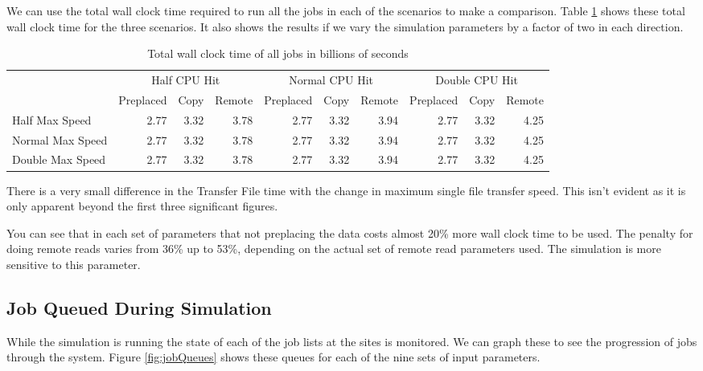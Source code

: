 \documentclass[a4paper]{jpconf}
\begin{document}
We can use the total wall clock time required to run all the jobs in
each of the scenarios to make a comparison. Table \ref{tab:wallClock}
shows these total wall clock time for the three scenarios. It also
shows the results if we vary the simulation parameters by a factor of
two in each direction.


\begin{table}
  \begin{center}
    \begin{scriptsize}
      \begin{tabular}{|l|rrr|rrr|rrr|}
        \hline
        & \multicolumn{3}{|c|}{Half CPU Hit} & \multicolumn{3}{|c|}{Normal CPU
          Hit} & \multicolumn{3}{|c|}{Double CPU Hit} \\
        \cline{2-10}
        & Preplaced & Copy & Remote & Preplaced & Copy & Remote
        & Preplaced & Copy & Remote \\
        \hline
        Half Max Speed & 2.77 & 3.32 & 3.78 & 2.77 & 3.32 & 3.94 & 2.77
        & 3.32 & 4.25 \\
        Normal Max Speed & 2.77 & 3.32 & 3.78 & 2.77 & 3.32 & 3.94 & 2.77
        & 3.32 & 4.25 \\
        Double Max Speed & 2.77 & 3.32 & 3.78 & 2.77 & 3.32 & 3.94 & 2.77
        & 3.32 & 4.25 \\
        \hline
      \end{tabular}
      \caption{Total wall clock time of all jobs in billions of seconds\label{tab:wallClock}}
    \end{scriptsize}
  \end{center}
\end{table}

There is a very small difference in the Transfer File time with the
change in maximum single file transfer speed. This isn't evident as it
is only apparent beyond the first three significant figures.

You can see that in each set of parameters that not preplacing the
data costs almost 20\% more wall clock time to be used. The penalty
for doing remote reads varies from 36\% up to 53\%, depending on the
actual set of remote read parameters used. The simulation is more
sensitive to this parameter.

\subsection{Job Queued During Simulation}

While the simulation is running the state of each of the job lists at
the sites is monitored. We can graph these to see the progression of
jobs through the system. Figure \ref{fig:jobQueues} shows these queues
for each of the nine sets of input parameters.
\end{document}
